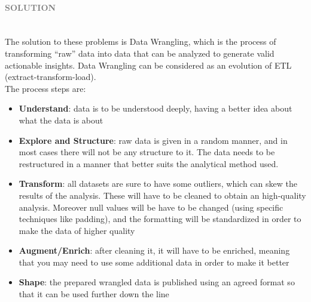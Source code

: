\documentclass[10pt,a4paper]{article}
\newcommand{\myparagraph}[1]{\paragraph{\normalsize{\textcolor{gray}{\uppercase{\textbf{#1}}}} }\mbox{} \vspace{0.5em}\\}
\begin{document}
\myparagraph{Solution}
The solution to these problems is Data Wrangling, which is the process of transforming “raw” data into data that can be analyzed to generate valid actionable insights. Data Wrangling can be considered as an evolution of ETL (extract-transform-load). \\ 
The process steps are:
\begin{itemize}
	\item \textbf{Understand}: data is to be understood deeply, having a better idea about what the data is about
	\item \textbf{Explore and Structure}: raw data is given in a random manner, and in most cases there will not be any structure to it. The data needs to be restructured in a manner that better suits the analytical method used.
	\item \textbf{Transform}: all datasets are sure to have some outliers, which can skew the results of the analysis. These will have to be cleaned to obtain an high-quality analysis. Moreover null values will be have to be changed (using specific techniques like padding), and the formatting will be standardized in order to make the data of higher quality
	\item \textbf{Augment/Enrich}:  after cleaning it, it will have to be enriched, meaning that you may need to use some additional data in order to make it better
	\item \textbf{Shape}: the prepared wrangled data is published using an agreed format so that it can be used further down the line
\end{itemize}
\end{document}

